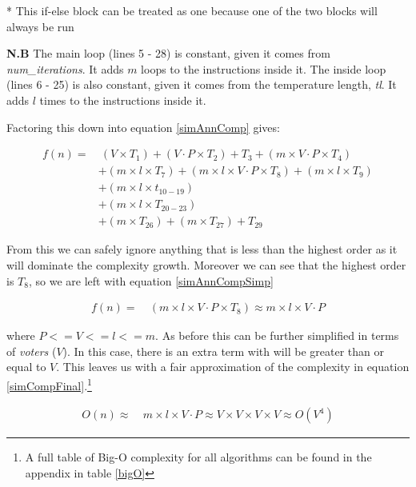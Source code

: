 \documentclass[12pt]{report}
\begin{document}
* This if-else block can be treated as one because one of the two blocks will always be run

\textbf{N.B} The main loop (lines 5 - 28) is constant, given it comes from \textit{num\_iterations}. It adds $m$ loops to the instructions inside it. The inside loop (lines 6 - 25) is also constant, given it comes from the temperature length, \textit{tl}. It adds $l$ times to the instructions inside it.

Factoring this down into equation \ref{simAnnComp} gives: 

\begin{equation}\label{simAnnComp}
\begin{aligned}
	f(n) ={} & \ (V \times T_1) + (V \cdot P \times T_2) + T_3  + (m \times V \cdot P \times T_4) \\
	 	& + (m \times l \times T_7) + (m \times l \times V \cdot P  \times T_8) + (m \times l \times T_9) \\
		& + (m \times l \times t_{10 - 19}) \\
		& + (m \times l \times T_{20 - 23}) \\
		& + (m \times T_{26}) + (m \times T_{27}) + T_{29}
\end{aligned}
\end{equation}

From this we can safely ignore anything that is less than the highest order as it will dominate the complexity growth. Moreover we can see that the highest order is $T_8$, so we are left with equation \ref{simAnnCompSimp}

\begin{equation}\label{simAnnCompSimp}
\begin{aligned}
	f(n) ={} & \ (m \times l \times V \cdot P \times T_8) \approx m \times l \times V \cdot P
\end{aligned}
\end{equation}

where $P <= V <= l <= m$. As before this can be further simplified in terms of \textit{voters} ($V$). In this case, there is an extra term with will be greater than or equal to $V$. This leaves us with a fair approximation of the complexity in equation \ref{simCompFinal}.\footnote{A full table of Big-O complexity for all algorithms can be found in the appendix in table \ref{bigO}}

\begin{equation}\label{simCompFinal}
\begin{aligned}
	O(n) \approx{} & \ m \times l \times V \cdot P \approx V \times V \times V \times V \approx O(V^4)
\end{aligned}
\end{equation}
\end{document}
